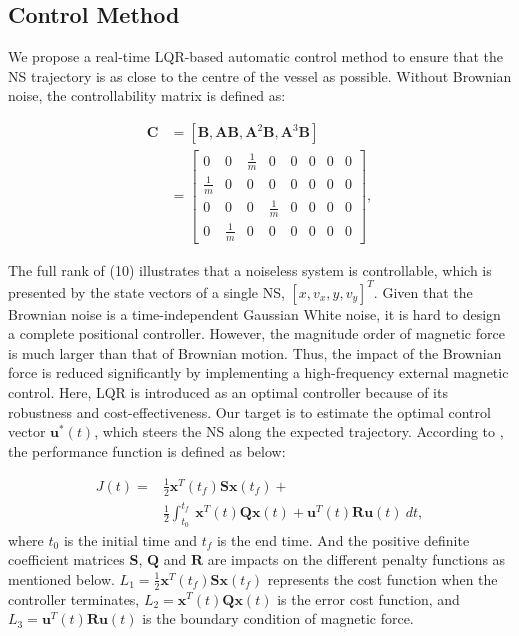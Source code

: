 \documentclass[conference]{IEEEtran}
\begin{document}
\subsection {Control Method}
We propose a real-time LQR-based automatic control method to ensure that the NS trajectory is as close to the centre of the vessel as possible. Without Brownian noise, the controllability matrix is defined as:

\begin{equation}
\label{eq8}
\begin{aligned}
	\textbf{C}&=\left[ {\textbf{B},\textbf{A}\textbf{B},\textbf{A}^{2}\textbf{B},\textbf{A}^{3} \textbf{B} } \right]\\
	& = \begin{bmatrix}
		0&0& {\frac{1}{m}}&0&0&0&0&0\\
		 {\frac{1}{m}}&0&0&0&0&0&0&0\\
		0&0&0& {\frac{1}{m}}&0&0&0&0\\
		0& {\frac{1}{m}}&0&0&0&0&0&0
	  \end{bmatrix},
\end {aligned}
\end{equation}

The full rank of (10) illustrates that a noiseless system is controllable, which is presented by the state vectors of a single NS, $\left[ x,v_x,y,v_y \right]^{T} $. Given that the Brownian noise is a time-independent Gaussian White noise, it is hard to design a complete positional controller. However, the magnitude order of magnetic force is much larger than that of Brownian motion. Thus, the impact of the Brownian force is reduced significantly by implementing a high-frequency external magnetic control. Here, LQR is introduced as an optimal controller because of its robustness and cost-effectiveness. Our target is to estimate the optimal control vector $\textbf{u}^{*}(t)$, which steers the NS along the expected trajectory. According to \cite{li2004iterative}, the performance function is defined as below:

\begin{equation}
\label{eq9}
\begin{aligned}
J(t)= &{\frac{1}{2}}\textbf{x}^{T}(t_{f})\textbf{S}\textbf{x}(t_{f}) + \\  &{\frac{1}{2}}\int_{t_{0}}^{t_{f}} \ \textbf{x}^{T}(t)\textbf{Q}\textbf{x}(t) + \textbf{u}^{T}(t)\textbf{R}\textbf{u}(t) \ dt,
\end {aligned}
\end{equation}
where $t_{0}$ is the initial time and $t_{f}$ is the end time. And the positive definite coefficient matrices $\textbf{S}$, $\textbf{Q}$ and $\textbf{R}$ are impacts on the different penalty functions as mentioned below. $L_{1}={\frac{1}{2}}\textbf{x}^{T}(t_{f})\textbf{S}\textbf{x}(t_{f}) $ represents the cost function when the controller terminates, $L_{2}=\textbf{x}^{T}(t)\textbf{Q}\textbf{x}(t) $ is the error cost function, and $L_{3}=\textbf{u}^{T}(t)\textbf{R}\textbf{u}(t) $ is the boundary condition of magnetic force. 
\end{document}
